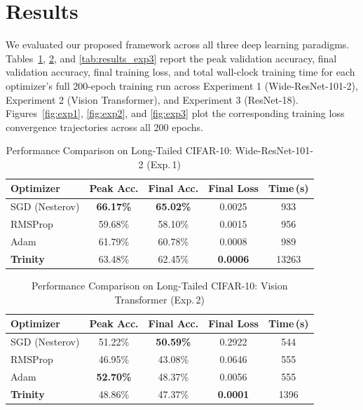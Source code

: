 \documentclass[conference]{IEEEtran}
\begin{document}
\section{Results}
\label{sec:results}

We evaluated our proposed framework across all three deep learning paradigms. Tables~\ref{tab:results_exp1}, \ref{tab:results_exp2}, and \ref{tab:results_exp3} report the peak validation accuracy, final validation accuracy, final training loss, and total wall-clock training time for each optimizer's full 200-epoch training run across Experiment 1 (Wide-ResNet-101-2), Experiment 2 (Vision Transformer), and Experiment 3 (ResNet-18). Figures~\ref{fig:exp1}, \ref{fig:exp2}, and \ref{fig:exp3} plot the corresponding training loss convergence trajectories across all 200 epochs.

\begin{table}[htbp]
\centering
\caption{Performance Comparison on Long-Tailed CIFAR-10: Wide-ResNet-101-2 (Exp.\,1)}
\label{tab:results_exp1}
\setlength{\tabcolsep}{4pt}
\begin{tabular}{lcccc}
\toprule
\textbf{Optimizer} & \textbf{Peak Acc.} & \textbf{Final Acc.} & \textbf{Final Loss} & \textbf{Time\,(s)} \\
\midrule
SGD (Nesterov)      & \textbf{66.17\%} & \textbf{65.02\%} & 0.0025 & 933 \\
RMSProp             & 59.68\% & 58.10\% & 0.0015 & 956 \\
Adam                & 61.79\% & 60.78\% & 0.0008 & 989 \\
\textbf{Trinity}    & 63.48\% & 62.45\% & \textbf{0.0006} & 13263 \\
\bottomrule
\end{tabular}
\end{table}

\begin{table}[htbp]
\centering
\caption{Performance Comparison on Long-Tailed CIFAR-10: Vision Transformer (Exp.\,2)}
\label{tab:results_exp2}
\setlength{\tabcolsep}{4pt}
\begin{tabular}{lcccc}
\toprule
\textbf{Optimizer} & \textbf{Peak Acc.} & \textbf{Final Acc.} & \textbf{Final Loss} & \textbf{Time\,(s)} \\
\midrule
SGD (Nesterov)      & 51.22\% & \textbf{50.59\%} & 0.2922 & 544 \\
RMSProp             & 46.95\% & 43.08\% & 0.0646 & 555 \\
Adam                & \textbf{52.70\%} & 48.37\% & 0.0056 & 555 \\
\textbf{Trinity}    & 48.86\% & 47.37\% & \textbf{0.0001} & 1396 \\
\bottomrule
\end{tabular}
\end{table}
\end{document}
